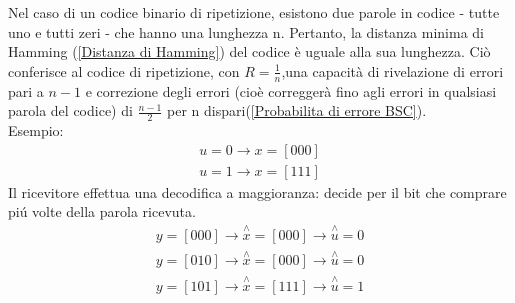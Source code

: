             Nel caso di un codice binario di ripetizione, esistono due parole in codice - tutte uno e tutti zeri - che hanno una lunghezza n. 
            Pertanto, la distanza minima di Hamming (\ref{Distanza di Hamming}) del codice è uguale alla sua lunghezza. Ciò conferisce al codice 
            di ripetizione, con $R = \frac{1}{n}$,una capacità di rivelazione di errori pari a $n-1$ e correzione degli errori (cioè correggerà fino agli errori in qualsiasi parola del codice) di $\frac{n-1}{2}$ per n dispari(\ref{Probabilita di errore BSC}).\\
            Esempio:\\
            \begin{align}
                u=0 \rightarrow x = [000]\nonumber \\
                u=1 \rightarrow x = [111]\nonumber
            \end{align} 
            Il ricevitore effettua una decodifica a maggioranza: decide per il bit che comprare piú volte della parola ricevuta.
            \begin{align}
                y = [000] \rightarrow \overset{\wedge}{x} = [000] \rightarrow \overset{\wedge}{u} = 0 \nonumber \\
                y = [010] \rightarrow \overset{\wedge}{x} = [000] \rightarrow \overset{\wedge}{u} = 0 \nonumber \\
                y = [101] \rightarrow \overset{\wedge}{x} = [111] \rightarrow \overset{\wedge}{u} = 1 \nonumber
            \end{align}
